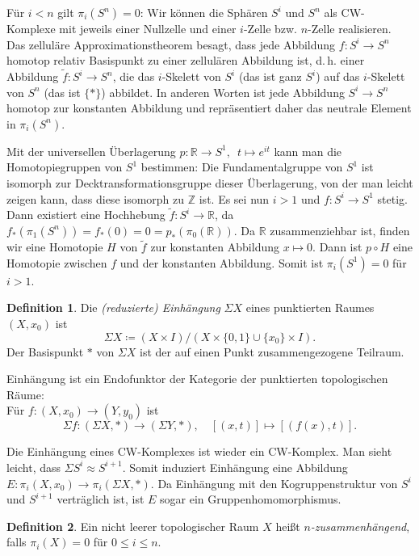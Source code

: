\documentclass[11pt, a4paper, german]{article}
\theoremstyle{definition}
\newtheorem{defn}{Definition}
\theoremstyle{remark}
\newcommand{\R}{\mathbb{R}} %
\newcommand{\Z}{\mathbb{Z}} %
\renewcommand{\dh}{d.\,h.} %
\begin{document}

Für $i < n$ gilt $\pi_i(S^n) = 0$:
Wir können die Sphären $S^i$ und $S^n$ als CW-Komplexe mit jeweils einer Nullzelle und einer $i$-Zelle bzw. $n$-Zelle realisieren.
Das zelluläre Approximationstheorem besagt, dass jede Abbildung $f : S^i \to S^n$ homotop relativ Basispunkt zu einer zellulären Abbildung ist, \dh{} einer Abbildung $\tilde{f} : S^i \to S^n$, die das $i$-Skelett von $S^i$ (das ist ganz $S^i$) auf das $i$-Skelett von $S^n$ (das ist $\{ * \}$) abbildet.
In anderen Worten ist jede Abbildung $S^i \to S^n$ homotop zur konstanten Abbildung und repräsentiert daher das neutrale Element in $\pi_i(S^n)$.

Mit der universellen Überlagerung $p : \R \to S^1, \enspace t \mapsto e^{it}$ kann man die Homotopiegruppen von $S^1$ bestimmen:
Die Fundamentalgruppe von $S^1$ ist isomorph zur Decktransformationsgruppe dieser Überlagerung, von der man leicht zeigen kann, dass diese isomorph zu $\Z$ ist.
Es sei nun $i > 1$ und $f : S^i \to S^1$ stetig.
Dann existiert eine Hochhebung $\tilde{f} : S^i \to \R$, da $f_* (\pi_1(S^n)) = f_*(0) = 0 = p_*(\pi_0(\R))$.
Da $\R$ zusammenziehbar ist, finden wir eine Homotopie $H$ von $\tilde{f}$ zur konstanten Abbildung $x \mapsto 0$.
Dann ist $p \circ H$ eine Homotopie zwischen $f$ und der konstanten Abbildung.
Somit ist $\pi_i(S^1) = 0$ für $i > 1$.

\begin{defn}
  Die \emph{(reduzierte) Einhängung} $\Sigma X$ eines punktierten Raumes $(X, x_0)$ ist
  \[ \Sigma X \coloneqq (X \times I) / (X \times \{ 0, 1 \} \cup \{ x_0 \} \times I). \]
  Der Basispunkt $*$ von $\Sigma X$ ist der auf einen Punkt zusammengezogene Teilraum.
\end{defn}

Einhängung ist ein Endofunktor der Kategorie der punktierten topologischen Räume: \\
Für $f : (X, x_0) \to (Y, y_0)$ ist
\[
  \Sigma f : (\Sigma X, *) \to (\Sigma Y, *), \quad
  [(x, t)] \mapsto [(f(x), t)].
\]

Die Einhängung eines CW-Komplexes ist wieder ein CW-Komplex.
Man sieht leicht, dass $\Sigma S^i \approx S^{i+1}$.
Somit induziert Einhängung eine Abbildung $E : \pi_i(X, x_0) \to \pi_i(\Sigma X, *)$.
Da Einhängung mit den Kogruppenstruktur von $S^i$ und $S^{i+1}$ verträglich ist, ist $E$ sogar ein Gruppenhomomorphismus.

\begin{defn}
  Ein nicht leerer topologischer Raum $X$ heißt \emph{$n$-zusammenhängend}, falls $\pi_i(X) = 0$ für $0 \leq i \leq n$.
\end{defn}
\end{document}
